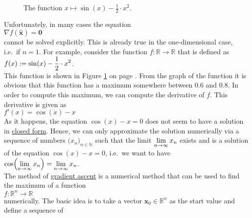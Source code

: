 \begin{figure}[!th]
\centering
{}
\vspace*{-0.3cm}
\caption{The function $x \mapsto \sin(x) - \frac{1}{2} \cdot x^2$.}
\label{fig:sin-minus-square.eps}
\end{figure}

\noindent
Unfortunately, in many cases the equation 
\\[0.2cm]
\hspace*{1.3cm}
$\nabla f(\mathbf{\widehat{x}}) = \mathbf{0}$
\\[0.2cm]
cannot be solved explicitly.  This is already true in the one-dimensional case, i.e.~if $n=1$.  For example, consider
the function $f:\mathbb{R} \rightarrow \mathbb{R}$ that is defined as
\\[0.2cm]
\hspace*{1.3cm}
$\displaystyle f(x) := \sin(x) - \frac{1}{2} \cdot x^2$.
\\[0.2cm]
This function is shown in Figure \ref{fig:sin-minus-square.eps} on page \pageref{fig:sin-minus-square.eps}.
From the graph of the function it is obvious that this function has a maximum somewhere between $0.6$ and
$0.8$.  In order to compute this maximum, we can compute the derivative of $f$.   This derivative is given as 
\\[0.2cm]
\hspace*{1.3cm}
$f'(x) = \cos(x) - x$
\\[0.2cm]
As it happens, the equation $\cos(x) - x = 0$ does not seem to have a solution in 
\href{https://en.wikipedia.org/wiki/Closed-form_expression}{closed form}.  Hence, we can only approximate
the solution numerically via a sequence of numbers $(x_n\bigr)_{n\in\mathbb{N}}$ such that the limit
$\displaystyle \lim\limits_{n\rightarrow\infty} x_n$
exists and is a solution of the equation $\cos(x) - x = 0$, i.e.~we want to have
\\[0.2cm]
\hspace*{1.3cm}
$\displaystyle \cos\Bigl(\lim\limits_{n\rightarrow\infty} x_n\Bigr) = \lim\limits_{n\rightarrow\infty} x_n$.
\\[0.2cm]
The method of \href{https://en.wikipedia.org/wiki/Gradient_descent}{gradient ascent} is a numerical
method that can be used to find the maximum of a function 
\\[0.2cm]
\hspace*{1.3cm}
$f: \mathbb{R}^n \rightarrow \mathbb{R}$
\\[0.2cm]
numerically.  The basic idea is to take a vector $\mathbf{x}_0 \in \mathbb{R}^n$ as the start value and define a sequence of
